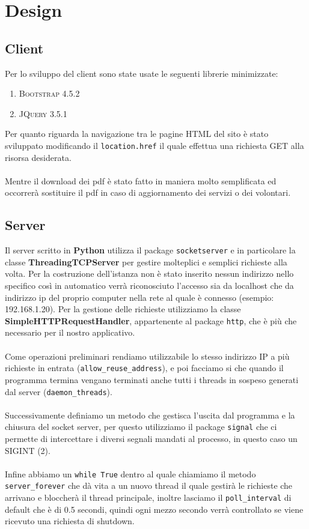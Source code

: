 \documentclass[a4paper,12pt]{report}
\begin{document}
\chapter{Design}

\section{Client}
Per lo sviluppo del client sono state usate le seguenti librerie minimizzate:

\begin{enumerate}
    \item \textsc{Bootstrap 4.5.2}
    \item \textsc{JQuery 3.5.1}
\end{enumerate}

Per quanto riguarda la navigazione tra le pagine HTML del sito è stato sviluppato modificando il  \texttt{location.href} il quale effettua una richiesta GET alla risorsa desiderata. 
\\
\\
Mentre il download dei pdf è stato fatto in maniera molto semplificata ed occorrerà sostituire il pdf in caso di aggiornamento dei servizi o dei volontari.

\clearpage

\section{Server}
Il server scritto in \textbf{Python} utilizza il package \texttt{socketserver} e in particolare la classe \textbf{ThreadingTCPServer} per gestire molteplici e semplici richieste alla volta.
Per la costruzione dell’istanza non è stato inserito nessun indirizzo nello specifico così in automatico verrà riconosciuto l’accesso sia da localhost che da indirizzo ip del proprio computer nella rete al quale è connesso (esempio: 192.168.1.20).
Per la gestione delle richieste utilizziamo la classe \textbf{SimpleHTTPRequestHandler}, appartenente al package \texttt{http}, che è più che necessario per il nostro applicativo.
\\
\\
Come operazioni preliminari rendiamo utilizzabile lo stesso indirizzo IP a più richieste in entrata (\texttt{allow\_reuse\_address}), e poi facciamo si che quando il programma termina vengano terminati anche tutti i threads in sospeso generati dal server (\texttt{daemon\_threads}).
\\
\\
Successivamente definiamo un metodo che gestisca l’uscita dal programma e la chiusura del socket server, per questo utilizziamo il package \texttt{signal} che ci permette di intercettare i diversi segnali mandati al processo, in questo caso un SIGINT (2).
\\
\\
Infine abbiamo un \texttt{while True} dentro al quale chiamiamo il metodo \texttt{server\_forever} che dà vita a un nuovo thread il quale gestirà le richieste che arrivano e bloccherà il thread principale, inoltre lasciamo il \texttt{poll\_interval} di default che è di 0.5 secondi, quindi ogni mezzo secondo verrà controllato se viene ricevuto una richiesta di shutdown.
\end{document}
